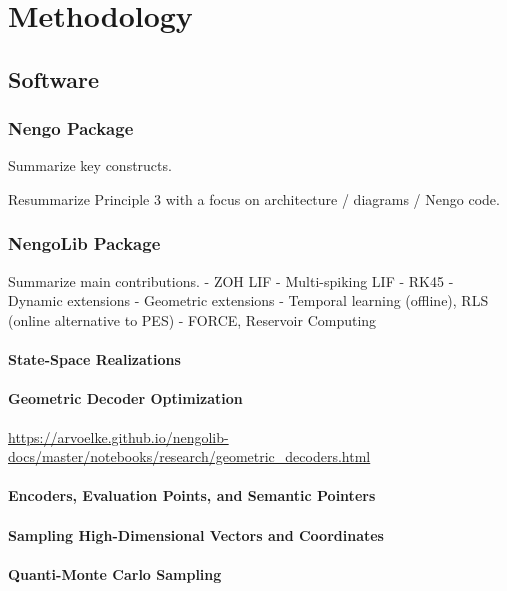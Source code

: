 \chapter{Methodology}
\label{chapt:methodology}


\section{Software}

\subsection{Nengo Package}

Summarize key constructs.

Resummarize Principle 3 with a focus on architecture / diagrams / Nengo code.

\subsection{NengoLib Package}

Summarize main contributions.
 - ZOH LIF
 - Multi-spiking LIF
 - RK45
 - Dynamic extensions
 - Geometric extensions
 - Temporal learning (offline), RLS (online alternative to PES)
 - FORCE, Reservoir Computing

\subsubsection{State-Space Realizations}

\subsubsection{Geometric Decoder Optimization}

\url{https://arvoelke.github.io/nengolib-docs/master/notebooks/research/geometric\_decoders.html}

\subsubsection{Encoders, Evaluation Points, and Semantic Pointers}

\subsubsection{Sampling High-Dimensional Vectors and Coordinates}

\subsubsection{Quanti-Monte Carlo Sampling}

